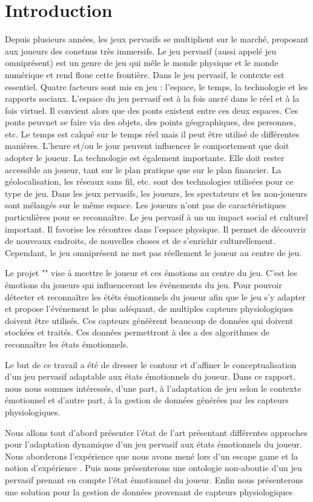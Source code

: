 \documentclass{article}
\begin{document}
\section{Introduction}
	Depuis plusieurs années, les jeux pervasifs se multiplient sur le marché, proposant aux joueurs des conetnus très immersifs.
	Le jeu pervasif (aussi appelé jeu omniprésent) est un genre de jeu qui mêle le monde physique et le monde numérique et rend floue cette frontière.
	Dans le jeu pervasif, le contexte est essentiel. 
	Quatre facteurs sont mis en jeu : l'espace, le temps, la technologie et les rapports sociaux. 
	L'espace du jeu pervasif est à la fois ancré dans le réel et à la fois virtuel.
	Il convient alors que des ponts existent entre ces deux espaces. 
	Ces ponts peuvnet se faire via des objets, des points géographiques, des personnes, etc. 
	Le temps est calqué sur le temps réel mais il peut être utilisé de différentes manières. 
	L'heure et/ou le jour peuvent influencer le comportement que doit adopter le joueur.
	La technologie est également importante. 
	Elle doit rester accessible au joueur, tant sur le plan pratique que sur le plan financier. 
	La géolocalisation, les réseaux sans fil, etc. sont des technologies utilisées pour ce type de jeu.
	Dans les jeux pervasifs, les joueurs, les spectateurs et les non-joueurs sont mélangés sur le même espace. 
	Les joueurs n'ont pas de caractéristiques particulières pour se reconnaître.%
	Le jeu pervasif à un un impact social et culturel important.
	Il favorise les récontres dans l'espace physique.
	Il permet de découvrir de nouveaux endroits, de nouvelles choses et de s'enrichir culturellement.
	Cependant, le jeu omniprésent ne met pas réellement le joueur au centre de jeu.\par
	Le projet "" vise à meettre le joueur et ces émotions au centre du jeu.
	C'est les émotions du joueurs qui influenceront les événements du jeu.
	Pour pouvoir détecter et reconnaître les ététs émotionnels du joueur afin que le jeu s'y adapter et propose l'événement le plus adéquant, de multiples capteurs physiologiques doivent être utilisés.
	Ces capteurs généèrent beaucoup de données qui doivent stockées et traités.
	Ces données permettront à des a des algorithmes de reconnaître les états émotionnels.\par
	Le but de ce travail a été de dresser le contour et d'affiner le conceptualisation d'un jeu pervasif adaptable aux états émotionnels du joueur. 
	Dans ce rapport, nous nous sommes intéressés, d'une part, à l'adaptation de jeu selon le contexte émotionnel et d'autre part, à la gestion de données générées par les capteurs physiologiques.\par
	Nous allons tout d'abord présenter l'état de l'art présentant différentes approches pour l'adaptation dynamique d'un jeu pervasif aux états émotionnels du joueur.
	Nous aborderons l'expérience que nous avons mené lors d'un escape game et la notion d'expérience .
	Puis nous présenterons une ontologie non-aboutie d'un jeu pervasif prenant en compte l'état émotionnel du joueur.
	Enfin nous présenterons une solution pour la gestion de données provenant de capteurs physiologiques
\end{document}

